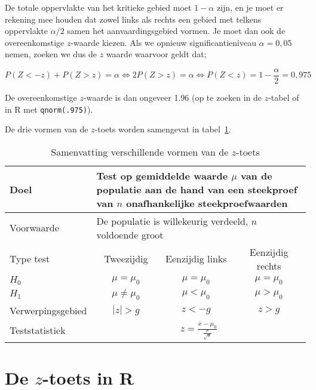 De totale oppervlakte van het kritieke gebied moet $1 - \alpha$ zijn, en je moet er rekening mee houden dat zowel links als rechts een gebied met telkens oppervlakte $\alpha / 2$ samen het aanvaardingsgebied vormen. Je moet dan ook de overeenkomstige $z$-waarde kiezen. Als we opnieuw significantieniveau $\alpha = 0,05$ nemen, zoeken we dus de $z$ waarde waarvoor geldt dat;

\[P(Z < -z) + P(Z > z) = \alpha \Leftrightarrow 2 P(Z>z) = \alpha \Leftrightarrow P(Z < z) = 1-\frac{\alpha}{2} = 0,975\]

De overeenkomstige $z$-waarde is dan ongeveer 1.96 (op te zoeken in de $z$-tabel of in R met \texttt{qnorm(.975)}).

De drie vormen van de $z$-toets worden samengevat in tabel~\ref{tab:toetsingsprocedures}.

\begin{table}
  \centering
  \begin{tabular}{l|ccc}
    \toprule
    Doel              & \multicolumn{3}{l}{\parbox{.5\textwidth}{Test op gemiddelde waarde $\mu$ van de populatie aan de hand van een steekproef van $n$ onafhankelijke steekproefwaarden}} \\
    \midrule
    Voorwaarde        & \multicolumn{3}{l}{\parbox{.5\textwidth}{De populatie is willekeurig verdeeld, $n$ voldoende groot}} \\
    \midrule
    Type test         & Tweezijdig           & Eenzijdig links & Eenzijdig rechts \\
    \midrule
    $H_{0}$           & $\mu = \mu_{0}$      & $\mu = \mu_{0}$ & $\mu = \mu_{0}$  \\
    $H_{1}$           & $\mu \neq \mu_{0}$   & $\mu < \mu_{0}$ & $\mu > \mu_{0}$  \\
    Verwerpingsgebied & $\left|z\right| > g$ & $z< -g $        & $z>g$            \\
    Teststatistiek    & \multicolumn{3}{c}{$z = \frac{\overline{x} - \mu_{0}}{\frac{\sigma}{\sqrt{n}}}$} \\
    \bottomrule
  \end{tabular}
  \caption{Samenvatting verschillende vormen van de $z$-toets}
  \label{tab:toetsingsprocedures}
\end{table}

\section{De \texorpdfstring{$z$}{z}-toets in R}
\label{sec:z-toets-R}

